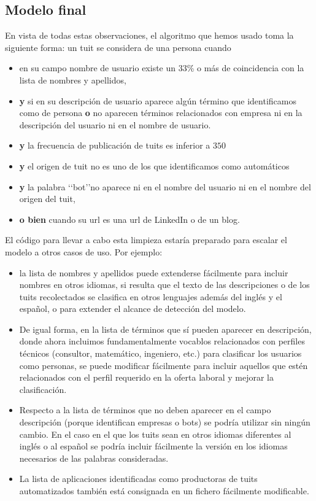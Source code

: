 \subsection{Modelo final}

En vista de todas estas observaciones, el algoritmo que hemos usado toma la siguiente forma:
un tuit se considera de una persona cuando 
\begin{itemize}
\item en su campo nombre de usuario existe un $33$\% o más 
de coincidencia con la lista de nombres y apellidos, 
\item {\bf y} si en su descripción de usuario aparece algún término que
identificamos como de persona {\bf o} no aparecen términos 
relacionados con empresa ni en la descripción del usuario ni en el nombre de usuario.
\item {\bf y} la frecuencia de publicación de tuits es inferior a $350$
\item {\bf y} el origen de tuit no es uno de los que identificamos como automáticos
\item {\bf y} la palabra \lq\lq bot\rq\rq no aparece ni en el nombre del usuario ni
en el nombre del origen del tuit,
\item {\bf o bien}  cuando su url es una url de LinkedIn o de un blog.
\end{itemize}

El código para llevar a cabo esta limpieza estaría preparado para escalar
el modelo a otros casos de uso. Por ejemplo:
\begin{itemize}
\item la lista de nombres y apellidos puede extenderse fácilmente para incluir nombres
en otros idiomas, si resulta que el texto de las descripciones o de los tuits recolectados
se clasifica en otros lenguajes además del inglés y el español, o para extender el alcance de
detección del modelo.
\item De igual forma, en la lista de términos que sí pueden aparecer en descripción, donde ahora
incluimos fundamentalmente vocablos relacionados con perfiles técnicos (consultor, matemático, ingeniero, etc.)
para clasificar los usuarios como personas, se puede modificar fácilmente para incluir aquellos que estén 
relacionados con el perfil requerido en la oferta laboral y mejorar la clasificación.
\item Respecto a la lista de términos que no deben aparecer en el campo descripción (porque identifican empresas 
o bots) se podría utilizar sin ningún cambio. En el caso en el que los tuits sean en otros idiomas diferentes 
al inglés o al español se podría incluir fácilmente la versión en los idiomas necesarios de las palabras 
consideradas.
\item La lista de aplicaciones identificadas como productoras de tuits automatizados también
está consignada en un fichero fácilmente modificable.
\end{itemize}

